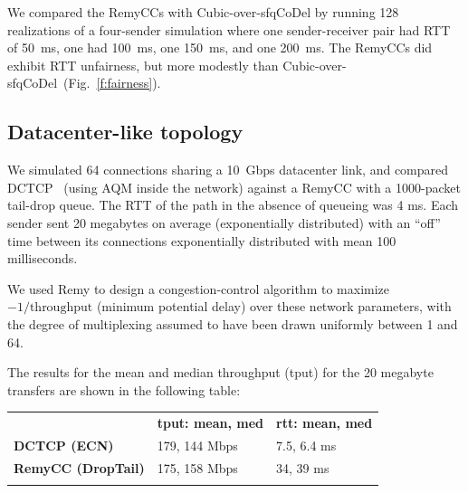 We compared the RemyCCs with Cubic-over-sfqCoDel by running 128
realizations of a four-sender simulation where one sender-receiver
pair had RTT of 50~ms, one had 100~ms, one 150~ms, and one 200~ms. The
RemyCCs did exhibit RTT unfairness, but more modestly than
Cubic-over-sfqCoDel~(Fig.~\ref{f:fairness}).

\subsection{Datacenter-like topology}

We simulated 64 connections sharing a 10~Gbps datacenter link, and
compared DCTCP~\cite{dctcp} (using AQM inside the network) against
a RemyCC with a 1000-packet tail-drop queue. The RTT of
the path in the absence of queueing was 4 ms. Each sender sent 20
megabytes on average (exponentially distributed) with an ``off'' time
between its connections exponentially distributed with mean 100
milliseconds.

We used Remy to design a congestion-control algorithm to maximize
$-1/\mbox{throughput}$ (minimum potential delay) over these network
parameters, with the degree of multiplexing assumed to have been drawn
uniformly between 1 and 64.




The results for the mean and median throughput (tput) for the 20 megabyte
transfers are shown in the following table:

\begin{tabular}{lll}
& \bf tput: mean, med & \bf rtt: mean, med\\
\bf DCTCP (ECN) & 179, 144 Mbps & 7.5, 6.4 ms\\
\bf RemyCC (DropTail) & 175, 158 Mbps & 34, 39 ms \\
\vspace{\baselineskip}
\end{tabular}

